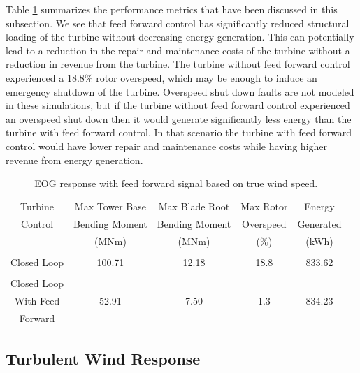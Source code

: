Table \ref{Table3-1} summarizes the performance metrics that have been discussed in this subsection. We see that feed forward control has significantly reduced structural loading of the turbine without decreasing energy generation. This can potentially lead to a reduction in the repair and maintenance costs of the turbine without a reduction in revenue from the turbine. The turbine without feed forward control experienced a 18.8$\%$ rotor overspeed, which may be enough to induce an emergency shutdown of the turbine. Overspeed shut down faults are not modeled in these simulations, but if the turbine without feed forward control experienced an overspeed shut down then it would generate significantly less energy than the turbine with feed forward control. In that scenario the turbine with feed forward control would have lower repair and maintenance costs while having higher revenue from energy generation.

\begin{table}
\centering
\begin{tabular}{ c | c c c c }
\hline
\hline
Turbine			& Max Tower	Base		& Max Blade	Root		& Max Rotor				& Energy\\
Control			& Bending Moment		& Bending Moment		& Overspeed					& Generated\\
					& (MNm)  				& (MNm)				& ($\%$)	& (kWh)\\
\hline
  &  &   &  &  \\
Closed Loop  & 100.71 & 12.18  &18.8 & 833.62 \\
 &  &   &  & \\
Closed Loop  &  &   &  &  \\
With Feed  & 52.91 & 7.50  & 1.3 & 834.23 \\
Forward  &  &   &  &  \\
\hline
\hline
\end{tabular}
\caption{EOG response with feed forward signal based on true wind speed.}
\label{Table3-1}
\end{table}

\subsection{Turbulent Wind Response} \label{section3-4-2}

